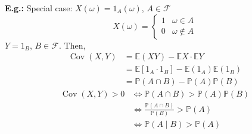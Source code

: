 \documentclass[a4paper]{article}
\newcommand{\n}{\hfill\break}
\newcommand{\eg}[1]{\par\noindent\settowidth{\hangindent}{\textbf{E.g.: }}\textbf{E.g.: }#1\n}
\newcommand{\F}{\mathcal F}
\newcommand{\Prob}{\mathbb{P}}
\renewcommand{\P}{\Prob}
\newcommand{\Avg}{\mathbb{E}}
\newcommand{\E}{\Avg}
\DeclareMathOperator{\Cov}{Cov}
\begin{document}
\eg{
    Special case: $X(\omega)=1_A(\omega)$, $A\in\F$
    \[X(\omega)=\left\{\begin{array}{lc}1&\omega\in A\\0&\omega\notin A\end{array}\right.\]
    $Y=1_B$, $B\in\F$. Then, 
    \begin{align*}
        \Cov(X,Y)&=\E(XY)-\E X\cdot\E Y \\
        &=\E[1_A\cdot1_B]-\E(1_A)\E(1_B) \\
        &=\P(A\cap B)-\P(A)\P(B)
    \end{align*}
    \begin{align*}
        \Cov(X,Y)>0 &\iff \P(A\cap B)>\P(A)\P(B) \\
        &\iff \frac{\P(A\cap B)}{\P(B)}>\P(A) \\
        &\iff \P(A\mid B)>\P(A)
    \end{align*}
}
\end{document}

